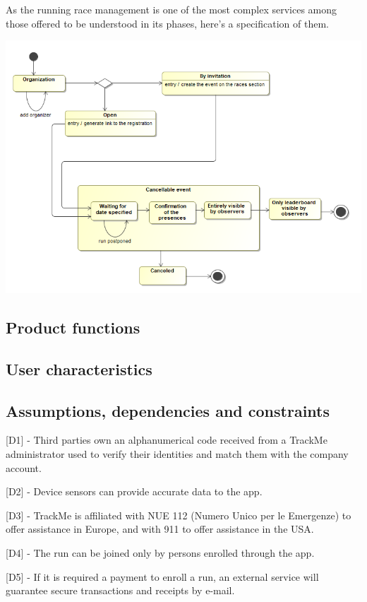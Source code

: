 As the running race management is one of the most complex services among those offered to be understood in its phases, here's a specification of them.

\begin{center}
\includegraphics[scale=0.4]{sections/diagrams/stateDiagram.png}
\end{center}

\subsection{Product functions}
\subsection{User characteristics}
\subsection{Assumptions, dependencies and constraints}
[D1] - Third parties own an alphanumerical code received from a TrackMe administrator used to verify their identities and match them with the company account. \newline

\hspace{-\parindent}[D2] - Device sensors can provide accurate data to the app. \newline

\hspace{-\parindent}[D3] - TrackMe is affiliated with NUE 112 (Numero Unico per le Emergenze) to offer assistance in Europe, and with 911 to offer assistance in the USA. \newline

\hspace{-\parindent}[D4] - The run can be joined only by persons enrolled through the app. \newline

\hspace{-\parindent}[D5] - If it is required a payment to enroll a run, an external service will guarantee secure transactions and receipts by e-mail. \newline

%